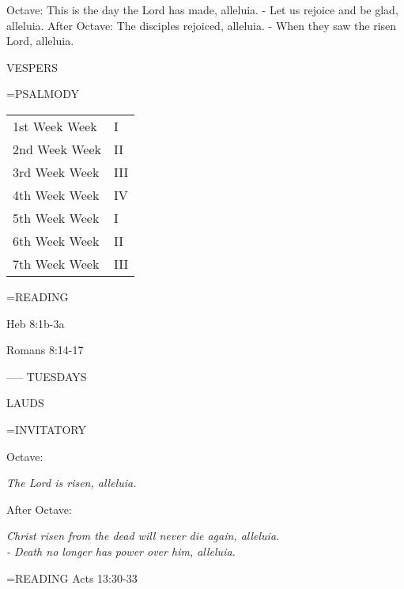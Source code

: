 Octave:	This is the day the Lord has made, alleluia.
		- Let us rejoice and be glad, alleluia.
After Octave:	The disciples rejoiced, alleluia.
		- When they saw the risen Lord, alleluia.

\begin{flushleft}\normalsize VESPERS\\\end{flushleft}
\hangindent=\parindent \small{PSALMODY}
\begin{center}
\begin{tabular}{ l l }
1st Week		Week &  I\\
2nd Week		Week &  II\\
3rd Week		Week &  III\\
4th Week		Week &  IV\\
5th Week		Week &  I\\
6th Week		Week &  II\\
7th Week		Week &  III\\
\end{tabular}
\end{center}		

\hangindent=\parindent \small READING
\begin{description}[labelindent=\parindent, leftmargin=*]
\item [1st-6th Week:]     Heb 8:1b-3a \textbf{    \\}
\item [7th Week:]     Romans 8:14-17 \textbf{    \\}
\end{description}

-----
TUESDAYS

\begin{flushleft}\normalsize LAUDS\\\end{flushleft}
\hangindent=\parindent \small{INVITATORY}
\begin{center}
\end{center}Octave:\begin{center}\textit{	The Lord is risen, alleluia.\\}
\end{center}After Octave:\begin{center}\textit{	Christ risen from the dead will never die again, alleluia.\\}
\textit{		- Death no longer has power over him, alleluia.\\}
\end{center}

\hangindent=\parindent \small{\uppercase{READING}}    Acts 13:30-33 \textbf{   \\}

